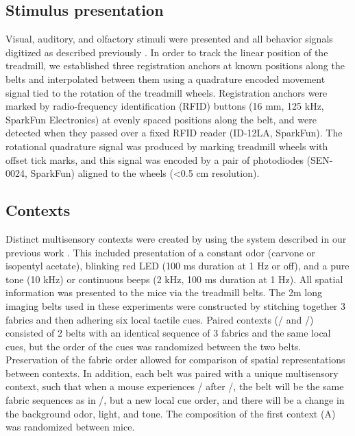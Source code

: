 \subsection{Stimulus presentation}
Visual, auditory, and olfactory stimuli were presented and all behavior signals digitized as described previously \citep{Danielson2016b}\citep{Kaifosh2013}\citep{Lovett-Barron2014}. In order to track the linear position of the treadmill, we established three registration anchors at known positions along the belts and interpolated between them using a quadrature encoded movement signal tied to the rotation of the treadmill wheels. Registration anchors were marked by radio-frequency identification (RFID) buttons (16 mm, 125 kHz, SparkFun Electronics) at evenly spaced positions along the belt, and were detected when they passed over a fixed RFID reader (ID-12LA, SparkFun).  The rotational quadrature signal was produced by marking treadmill wheels with offset tick marks, and this signal was encoded by a pair of photodiodes (SEN-0024, SparkFun) aligned to the wheels (<0.5 cm resolution).
\subsection{Contexts}\label{sec:methods:contexts}
Distinct multisensory contexts were created by using the system described in our previous work \citep{Lovett-Barron2014}. This included presentation of a constant odor (carvone or isopentyl acetate), blinking red LED (100 ms duration at 1 Hz or off), and a pure tone (10 kHz) or continuous beeps (2 kHz, 100 ms duration at 1 Hz). All spatial information was presented to the mice via the treadmill belts. The 2m long imaging belts used in these experiments were constructed by stitching together 3 fabrics and then adhering six local tactile cues. Paired contexts (\A/ and \Aprime/) consisted of 2 belts with an identical sequence of 3 fabrics and the same local cues, but the order of the cues was randomized between the two belts. Preservation of the fabric order allowed for comparison of spatial representations between contexts. In addition, each belt was paired with a unique multisensory context, such that when a mouse experiences \Aprime/ after \A/, the belt will be the same fabric sequences as in \A/, but a new local cue order, and there will be a change in the background odor, light, and tone. The composition of the first context (A) was randomized between mice.
